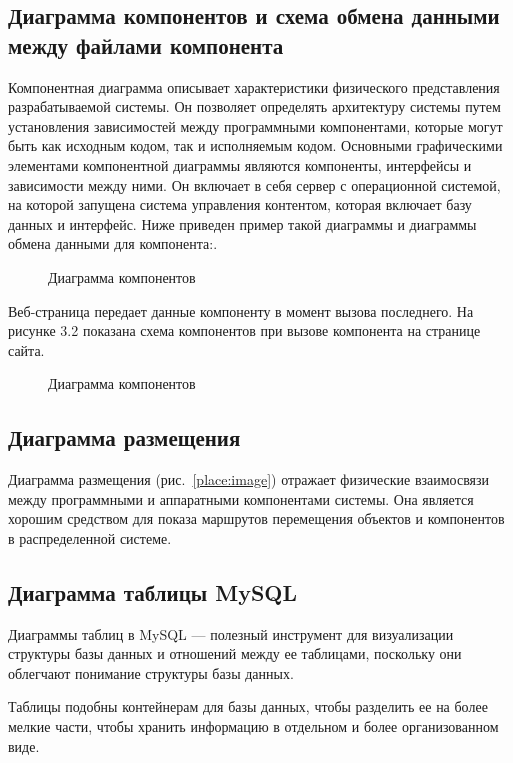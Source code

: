 \subsection{Диаграмма компонентов и схема обмена данными между файлами компонента}

Компонентная диаграмма описывает характеристики физического представления разрабатываемой системы. Он позволяет определять архитектуру системы путем установления зависимостей между программными компонентами, которые могут быть как исходным кодом, так и исполняемым кодом. Основными графическими элементами компонентной диаграммы являются компоненты, интерфейсы и зависимости между ними. Он включает в себя сервер с операционной системой, на которой запущена система управления контентом, которая включает базу данных и интерфейс. Ниже приведен пример такой диаграммы и диаграммы обмена данными для компонента:.

\begin{figure}[H]
\caption{Диаграмма компонентов}
\label{comp:image}
\end{figure}

Веб-страница передает данные компоненту в момент вызова последнего. На рисунке 3.2 показана схема компонентов при вызове компонента на странице сайта.

\begin{figure}[H]
\caption{Диаграмма компонентов}
\label{data:image}
\end{figure}

\subsection{Диаграмма размещения}

Диаграмма размещения (рис.~\ref{place:image}) отражает физические взаимосвязи между программными и аппаратными компонентами системы. Она является хорошим средством для показа маршрутов перемещения объектов и компонентов в распределенной системе.

\subsection{Диаграмма таблицы MySQL}
Диаграммы таблиц в MySQL — полезный инструмент для визуализации структуры базы данных и отношений между ее таблицами, поскольку они облегчают понимание структуры базы данных.

Таблицы подобны контейнерам для базы данных, чтобы разделить ее на более мелкие части, чтобы хранить информацию в отдельном и более организованном виде.

